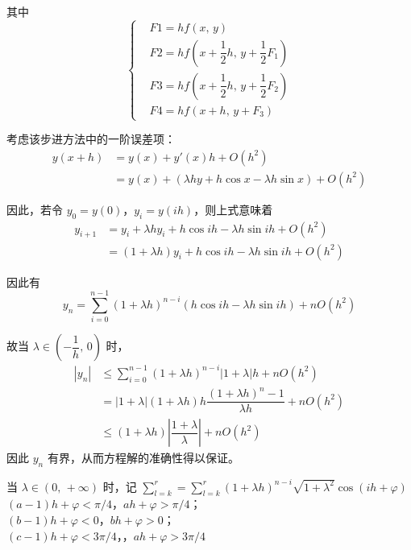 \documentclass{ctexart}
\begin{document}
	其中
	\begin{equation*}
	\left\{\begin{aligned}
		&F1 = h f(x,\,y)\\
		&F2 = h f(x + \dfrac{1}{2} h,\,y + \dfrac{1}{2} F_1)\\
		&F3 = h f(x + \dfrac{1}{2} h,\,y + \dfrac{1}{2} F_2)\\
		&F4 = h f(x + h,\,y + F_3)
	\end{aligned}\right.
	\end{equation*}
	
	考虑该步进方法中的一阶误差项：
	\begin{align*}
		y(x + h) & = y(x) + y'(x) h + O(h^2)\\
		& = y(x) + (\lambda h y + h\cos x - \lambda h \sin x) + O(h^2)
	\end{align*}
	
	因此，若令 $y_0 = y(0)$，$y_i = y(ih)$，则上式意味着
	\begin{align*}
		y_{i + 1} & = y_i + \lambda h y_i + h \cos ih - \lambda h \sin ih + O(h^2)\\
		& = (1 + \lambda h) y_i + h \cos ih - \lambda h \sin ih + O(h^2)
	\end{align*}
	
	因此有
	\begin{equation}
		y_n = \sum_{i = 0}^{n - 1} (1 + \lambda h)^{n - i} (h \cos ih - \lambda h \sin ih) + nO(h^2)
	\end{equation}
	
	故当 $\lambda \in (-\dfrac{1}{h},\,0)$ 时，
	\begin{align*}
		|y_n| & \leqslant \sum_{i = 0}^{n - 1} (1 + \lambda h)^{n - i}|1 + \lambda|h + n O(h^2)\\
		& = |1 + \lambda|(1 + \lambda h) h \dfrac{(1 + \lambda h)^n - 1}{\lambda h}+ n O(h^2)\\
		& \leqslant (1 + \lambda h) \left|\dfrac{1 + \lambda}{\lambda}\right|+ n O(h^2)
	\end{align*}
	因此 $y_n$ 有界，从而方程解的准确性得以保证。
	
	当 $\lambda \in (0,\,+\infty)$ 时，记 $\displaystyle\sum_{l = k}^r = \sum_{l = k}^r (1 + \lambda h)^{n - i} \sqrt{1 + \lambda^2}\cos(ih + \varphi)$\\
	$(a - 1) h + \varphi < \pi / 4$，$ah + \varphi > \pi / 4$；\\
	$(b - 1) h + \varphi < 0$，$bh + \varphi > 0$；\\
	$(c - 1) h + \varphi < 3 \pi / 4$，，$ah + \varphi > 3 \pi / 4$
	
\end{document}
